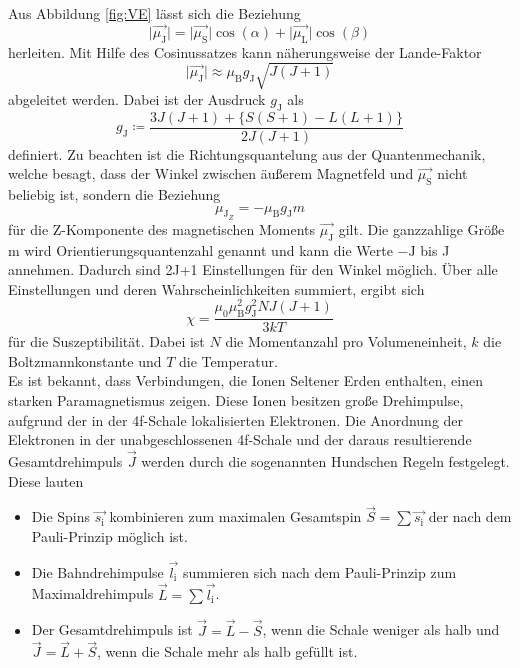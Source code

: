 Aus Abbildung \ref{fig:VE} lässt sich die Beziehung
\begin{equation}
    \lvert \vec{\mu_\text{J}} \rvert = \lvert \vec{\mu_\text{S}} \rvert \cos(\alpha) + \lvert \vec{\mu_\text{L}} \rvert \cos(\beta)
\end{equation}
herleiten. Mit Hilfe des Cosinussatzes kann näherungsweise der Lande-Faktor
\begin{equation}
    \lvert \vec{\mu_\text{J}} \rvert \approx \mu_\text{B} g_\text{J} \sqrt{J\left(J+1\right)}
\end{equation}
abgeleitet werden. Dabei ist der Ausdruck $g_\text{J}$ als
\begin{equation}
    g_\text{J} \coloneq \frac{3 J \left(J+1\right) + \{S\left(S+1\right)-L \left(L+1\right)\}}{2J\left(J+1\right)}
\end{equation}
definiert.
Zu beachten ist die Richtungsquantelung aus der Quantenmechanik, welche besagt, dass der Winkel zwischen äußerem Magnetfeld und $\vec{\mu_\text{S}}$
nicht beliebig ist, sondern die Beziehung
\begin{equation}
    \mu_{\text{J}_Z}=- \mu_\text{B} g_\text{J} m
\end{equation}
für die Z-Komponente des magnetischen Moments $\vec{\mu_\text{J}}$ gilt. Die ganzzahlige Größe m wird Orientierungsquantenzahl genannt und kann die Werte $-\text{J}$ bis J annehmen.
Dadurch sind 2J+1 Einstellungen für den Winkel möglich. 
Über alle Einstellungen und deren Wahrscheinlichkeiten summiert, ergibt sich
\begin{equation}
    \chi=\frac{\mu_0 \mu_\text{B}^2 g_\text{J}^2 N J \left(J+1\right)}{3 k T}
\end{equation}
für die Suszeptibilität. Dabei ist $N$ die Momentanzahl pro Volumeneinheit, $k$ die Boltzmannkonstante und $T$ die Temperatur.
\\
Es ist bekannt, dass Verbindungen, die Ionen Seltener Erden enthalten, einen starken Paramagnetismus zeigen.
Diese Ionen besitzen große Drehimpulse, aufgrund der in der 4f-Schale lokalisierten Elektronen. 
Die Anordnung  der  Elektronen  in  der  unabgeschlossenen  4f-Schale  und  der  daraus  resultierende  Gesamtdrehimpuls  $\vec{J}$  werden  durch  die  sogenannten  Hundschen  Regeln  festgelegt.
Diese lauten
\begin{itemize}
    \item Die Spins $\vec{s_\text{i}}$ kombinieren zum maximalen Gesamtspin $\vec{S}= \sum \vec{s_\text{i}}$ der nach dem Pauli-Prinzip möglich ist.
    \item Die Bahndrehimpulse $\vec{l_\text{i}}$ summieren sich nach dem Pauli-Prinzip zum Maximaldrehimpuls $\vec{L}=\sum \vec{l_\text{i}}$.
    \item Der Gesamtdrehimpuls ist $\vec{J}=\vec{L}-\vec{S}$, wenn die Schale weniger als halb und $\vec{J}=\vec{L}+\vec{S}$, wenn die Schale mehr als halb gefüllt ist.
\end{itemize}
